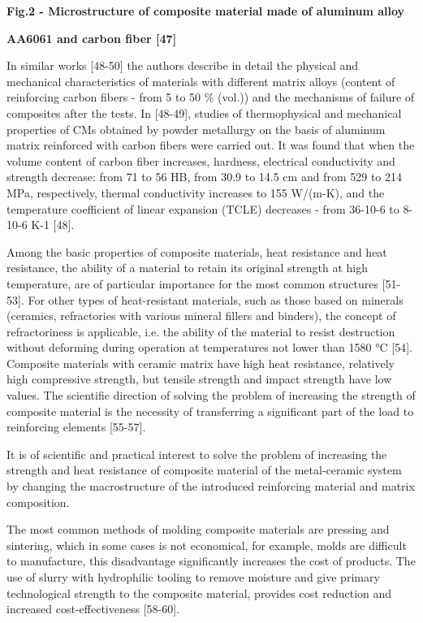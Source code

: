 {\bfseries Fig.2 - Microstructure of composite material made of aluminum
alloy}

{\bfseries AA6061 and carbon fiber {[}47{]}}

In similar works {[}48-50{]} the authors describe in detail the physical
and mechanical characteristics of materials with different matrix alloys
(content of reinforcing carbon fibers - from 5 to 50 \% (vol.)) and the
mechanisms of failure of composites after the tests. In {[}48-49{]},
studies of thermophysical and mechanical properties of CMs obtained by
powder metallurgy on the basis of aluminum matrix reinforced with carbon
fibers were carried out. It was found that when the volume content of
carbon fiber increases, hardness, electrical conductivity and strength
decrease: from 71 to 56 HB, from 30.9 to 14.5 cm and from 529 to 214
MPa, respectively, thermal conductivity increases to 155 W/(m-K), and
the temperature coefficient of linear expansion (TCLE) decreases - from
36-10-6 to 8-10-6 K-1 {[}48{]}.

Among the basic properties of composite materials, heat resistance and
heat resistance, the ability of a material to retain its original
strength at high temperature, are of particular importance for the most
common structures {[}51-53{]}. For other types of heat-resistant
materials, such as those based on minerals (ceramics, refractories with
various mineral fillers and binders), the concept of refractoriness is
applicable, i.e. the ability of the material to resist destruction
without deforming during operation at temperatures not lower than 1580
°C {[}54{]}. Composite materials with ceramic matrix have high heat
resistance, relatively high compressive strength, but tensile strength
and impact strength have low values. The scientific direction of solving
the problem of increasing the strength of composite material is the
necessity of transferring a significant part of the load to reinforcing
elements {[}55-57{]}.

It is of scientific and practical interest to solve the problem of
increasing the strength and heat resistance of composite material of the
metal-ceramic system by changing the macrostructure of the introduced
reinforcing material and matrix composition.

The most common methods of molding composite materials are pressing and
sintering, which in some cases is not economical, for example, molds are
difficult to manufacture, this disadvantage significantly increases the
cost of products. The use of slurry with hydrophilic tooling to remove
moisture and give primary technological strength to the composite
material, provides cost reduction and increased cost-effectiveness
{[}58-60{]}.

